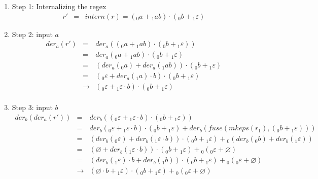 \documentclass[12pt]{article}
\newcommand{\der}{\textit{der}}
\newcommand{\fuse}{\textit{fuse}}
\newcommand{\mkeps}{\textit{mkeps}}
\newcommand{\intern}{\textit{intern}}
\begin{document}
\begin{enumerate}
  \item Step 1: Internalizing the regex
  \[
    \begin{array}{rcl}
    r' & = & \intern(r) = ({}_0a + {}_1ab) \cdot ({}_0b + {}_1\varepsilon)
    \end{array}
  \]

  \item Step 2: input $a$
    \[
    \begin{array}{rcl}
    \der_a (r') & =           & \der_a(({}_0a + {}_1ab) \cdot ({}_0b + {}_1\varepsilon))\\
                & =           & \der_a({}_0a + {}_1ab) \cdot ({}_0b + {}_1\varepsilon)\\
                & =           & (\der_a({}_0a) + \der_a({}_1ab)) \cdot ({}_0b + {}_1\varepsilon)\\
                & =           & ({}_0\varepsilon + \der_a({}_1a) \cdot b ) \cdot ({}_0b + {}_1\varepsilon)\\
                & \rightarrow & ({}_0\varepsilon + {}_1\varepsilon \cdot b) \cdot ({}_0b + {}_1\varepsilon)\\
    \end{array}
    \]

  \item Step 3: input $b$
  \[
    \begin{array}{rcl}
    \der_b(\der_a(r')) & =           & \der_b(({}_0\varepsilon + {}_1\varepsilon \cdot b) \cdot ({}_0b + {}_1\varepsilon))\\
                       & =           & \der_b({}_0\varepsilon + {}_1\varepsilon \cdot b) \cdot ({}_0b + {}_1\varepsilon) + \der_b(\fuse(\mkeps(r_1),({}_0b + {}_1\varepsilon))) \\
                       & =           & (\der_b({}_0\varepsilon) + \der_b({}_1\varepsilon \cdot b)) \cdot ({}_0b + {}_1\varepsilon) + {}_0(\der_b({}_0b) + \der_b({}_1\varepsilon)) \\
                       & =           & (\varnothing + \der_b({}_1\varepsilon \cdot b)) \cdot ({}_0b + {}_1\varepsilon) + {}_0({}_0\varepsilon + \varnothing) \\
                       & =           & (\der_b({}_1\varepsilon)\cdot b + \der_b({}_1b)) \cdot ({}_0b + {}_1\varepsilon) + {}_0({}_0\varepsilon + \varnothing) \\
                       & \rightarrow & (\varnothing \cdot b + {}_1\varepsilon) \cdot ({}_0b + {}_1\varepsilon) + {}_0({}_0\varepsilon + \varnothing) \\
    \end{array}
  \]

\end{enumerate}
\end{document}
